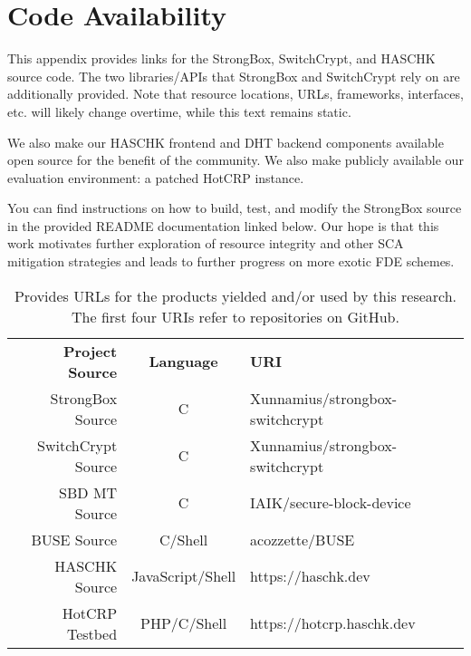 \renewcommand\thechapter{A}
\chapter{Code Availability} \label{app:availability}

This appendix provides links for the StrongBox, SwitchCrypt, and HASCHK source
code. The two libraries/APIs that StrongBox and SwitchCrypt rely on are
additionally provided. Note that resource locations, URLs, frameworks,
interfaces, etc. will likely change overtime, while this text remains static.

We also make our HASCHK frontend and DHT backend components available open
source for the benefit of the community. We also make publicly available our
evaluation environment: a patched HotCRP instance.

You can find instructions on how to build, test, and modify the StrongBox source
in the provided README documentation linked below. Our hope is that this work
motivates further exploration of resource integrity and other SCA mitigation
strategies and leads to further progress on more exotic FDE schemes.

\begin{table}
    \centering
    \caption{Provides URLs for the products yielded and/or used by this research. The first four URIs refer to repositories on GitHub.}
    \begin{tabular}{|r|c|l|l}
        \cline{1-3}
        \textbf{Project Source} & \textbf{Language} & \textbf{URI} & \\
        \cline{1-3}
        StrongBox Source & C & Xunnamius/strongbox-switchcrypt & \\
        SwitchCrypt Source & C & Xunnamius/strongbox-switchcrypt & \\
        SBD MT Source & C & IAIK/secure-block-device & \\
        BUSE Source & C/Shell & acozzette/BUSE & \\
        HASCHK Source & JavaScript/Shell & https://haschk.dev & \\
        HotCRP Testbed & PHP/C/Shell & https://hotcrp.haschk.dev & \\
        \cline{1-3}
    \end{tabular}
\end{table}
